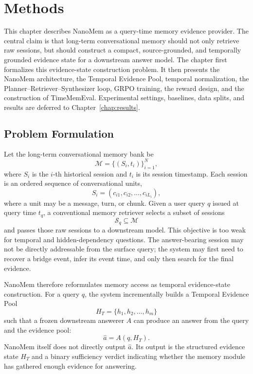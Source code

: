 \chapter{Methods}
\label{chap:methods}

This chapter describes NanoMem as a query-time memory evidence provider. The
central claim is that long-term conversational memory should not only retrieve
raw sessions, but should construct a compact, source-grounded, and temporally
grounded evidence state for a downstream answer model. The chapter first
formalizes this evidence-state construction problem. It then presents the
NanoMem architecture, the Temporal Evidence Pool, temporal normalization, the
Planner--Retriever--Synthesizer loop, GRPO training, the reward design, and the
construction of TimeMemEval. Experimental settings, baselines, data splits, and
results are deferred to Chapter~\ref{chap:results}.

\section{Problem Formulation}
\label{sec:methods-formulation}

Let the long-term conversational memory bank be
\[
  \mathcal{M}=\{(S_i,t_i)\}_{i=1}^{N},
\]
where $S_i$ is the $i$-th historical session and $t_i$ is its session timestamp.
Each session is an ordered sequence of conversational units,
\[
  S_i=(c_{i1},c_{i2},\ldots,c_{iL_i}),
\]
where a unit may be a message, turn, or chunk. Given a user query $q$ issued at
query time $t_q$, a conventional memory retriever selects a subset of sessions
\[
  \mathcal{S}_q \subseteq \mathcal{M}
\]
and passes those raw sessions to a downstream model. This objective is too weak
for temporal and hidden-dependency questions. The answer-bearing session may not
be directly addressable from the surface query; the system may first need to
recover a bridge event, infer its event time, and only then search for the final
evidence.

NanoMem therefore reformulates memory access as temporal evidence-state
construction. For a query $q$, the system incrementally builds a Temporal
Evidence Pool
\[
  H_T=\{h_1,h_2,\ldots,h_m\}
\]
such that a frozen downstream answerer $A$ can produce an answer from the query
and the evidence pool:
\[
  \hat{a}=A(q,H_T).
\]
NanoMem itself does not directly output $\hat{a}$. Its output is the structured
evidence state $H_T$ and a binary sufficiency verdict indicating whether the
memory module has gathered enough evidence for answering.

